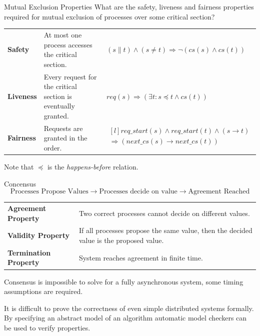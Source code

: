 \begin{examplebox}{Mutual Exclusion Properties}
    What are the safety, liveness and fairness properties required for mutual exclusion of processes over some critical section?
    \tcblower
    \begin{center}
        \begin{tabular}{l p{} l}
            \textbf{Safety} & At most one process accesses the critical section. & $(s \| t) \land (s \neq t) \Rightarrow \neg (cs(s) \land cs(t))$ \\
            \textbf{Liveness} & Every request for the critical section is eventually granted. & $req(s) \Rightarrow (\exists t : s \preccurlyeq t \land cs(t))$ \\
            \textbf{Fairness} & Requests are granted in the order. & $\begin{matrix*}[l]
                req\_start(s) \land req\_start(t) \land (s \to t) \\
                \Rightarrow (next\_cs(s) \to next\_cs(t)) \\
            \end{matrix*}$ \\
        \end{tabular}
    \end{center}
    Note that $\preccurlyeq$ is the \textit{happens-before} relation.
\end{examplebox}

\begin{definitionbox}{Concensus}
    \[\text{Processes Propose Values} \to \text{Processes decide on value} \to \text{Agreement Reached}\]
    \begin{center}
        \begin{tabular}{l p{}}
            \textbf{Agreement Property} & Two correct processes cannot decide on different values. \\
            \textbf{Validity Property} & If all processes propose the same value, then the decided value is the proposed value. \\
            \textbf{Termination Property} & System reaches agreement in finite time. \\
        \end{tabular}
    \end{center}
    Consensus is impossible to solve for a fully asynchronous system, some timing assumptions are required.
\end{definitionbox}

It is difficult to prove the correctness of even simple distributed systems formally. By specifying an abstract model of an algorithm automatic model checkers can be used to verify properties.

